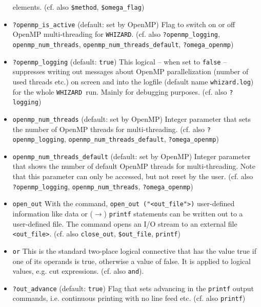 \documentclass[12pt]{book}
\newcommand{\ttt}[1]{\texttt{#1}}
\newcommand{\whizard}{\texttt{WHIZARD}}
\begin{document}
\begin{itemize}
elements. (cf. also \ttt{\$method}, \ttt{\$omega\_flag})
\item
\ttt{?openmp\_is\_active} \qquad (default: set by OpenMP) \newline
Flag to switch on or off OpenMP multi-threading for
\whizard. (cf. also \ttt{?openmp\_logging},
\ttt{openmp\_num\_threads}, \ttt{openmp\_num\_threads\_default},
\ttt{?omega\_openmp})
\item
\ttt{?openmp\_logging} \qquad (default: \ttt{true}) \newline
This logical -- when set to \ttt{false} -- suppresses writing out
messages about OpenMP parallelization (number of used threads etc.) on
screen and into the logfile (default name \ttt{whizard.log}) for the
whole \whizard\ run. Mainly for debugging purposes. 
(cf. also \ttt{?logging})
\item
\ttt{openmp\_num\_threads} \qquad (default: set by OpenMP) \newline
Integer parameter that sets the number of OpenMP threads for
multi-threading.  (cf. also \ttt{?openmp\_logging},
\ttt{openmp\_num\_threads\_default},
\ttt{?omega\_openmp})
\item
\ttt{openmp\_num\_threads\_default} \qquad (default: set by OpenMP) \newline
Integer parameter that shows the number of default OpenMP threads for
multi-threading. Note that this parameter can only be accessed, but
not reset by the user. (cf. also \ttt{?openmp\_logging},
\ttt{openmp\_num\_threads},
\ttt{?omega\_openmp})
\item
\ttt{open\_out} \newline
With the command, \ttt{open\_out ("<out\_file">)} user-defined
information like data or ($\to$) \ttt{printf} statements can be
written out to a user-defined file. The command opens an I/O stream to
an external file \ttt{<out\_file>}. (cf. also \ttt{close\_out},
\ttt{\$out\_file}, \ttt{printf})
\item
\ttt{or} \newline
This is the standard two-place logical connective that has the value
true if one of its operands is true, otherwise a value of false. It
is applied to logical values, e.g. cut expressions. (cf. also
\ttt{and}).
\item
\ttt{?out\_advance} \qquad (default: \ttt{true}) \newline
Flag that sets advancing in the \ttt{printf} output commands,
i.e. continuous printing with no line feed etc. (cf. also \ttt{printf})

\end{itemize}
\end{document}
